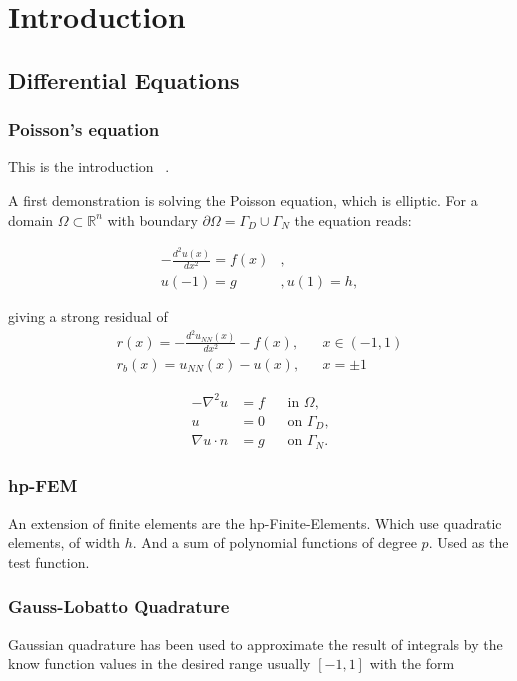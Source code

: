\chapter{Introduction}

\section{Differential Equations}
\subsection{Poisson's equation}

This is the introduction ~\cite{Example}.

A first demonstration is solving the Poisson equation, which is elliptic. For a domain
$ \Omega \subset \mathbb{R}^n $ with boundary $\partial \Omega = \Gamma_{D} \cup \Gamma_{N}$ the equation reads:

\begin{align}
  - \frac{d^2u(x)}{dx^2} = f(x) &, \\
  u(-1) = g &, u(1) = h,
\end{align}

giving a strong residual of
\begin{align}
  r(x) = - \frac{d^2u_{NN}(x)}{dx^2} - f(x), && x \in  (-1, 1) \\
  r_b(x) = u_{NN}(x) - u(x), && x = \pm 1
\end{align}

\begin{align}
  -\nabla^2 u   &= f  && \text{in $\Omega$,} \\
      u   &= 0  && \text{on $\Gamma_D$,} \\
  \nabla u \cdot n &= g  && \text{on $\Gamma_N$.}
\end{align}

\subsection{hp-FEM}
An extension of finite elements are the hp-Finite-Elements.
Which use quadratic elements, of width $h$. And a sum of polynomial functions of degree $p$. Used as the test function.

\subsection{Gauss-Lobatto Quadrature}

Gaussian quadrature has been used to approximate the result of integrals by the know function values in the desired range usually $[-1, 1]$ with the form

